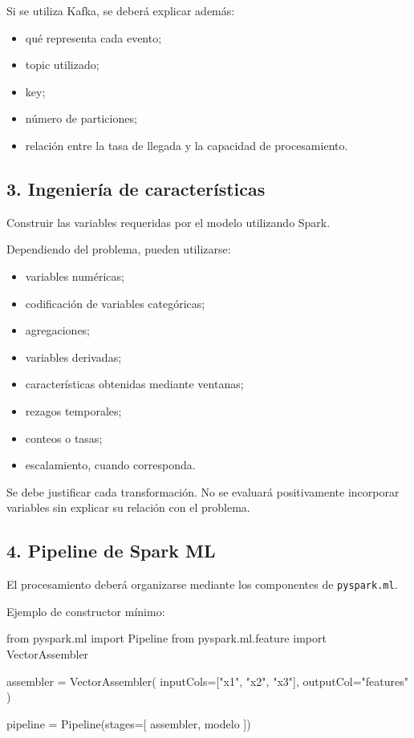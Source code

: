 \documentclass[11pt,a4paper]{article}
\begin{document}
Si se utiliza Kafka, se deberá explicar además:

\begin{itemize}
  \item qué representa cada evento;
  \item topic utilizado;
  \item key;
  \item número de particiones;
  \item relación entre la tasa de llegada y la capacidad de procesamiento.
\end{itemize}

\subsection{3. Ingeniería de características}

Construir las variables requeridas por el modelo utilizando Spark.

Dependiendo del problema, pueden utilizarse:

\begin{itemize}
  \item variables numéricas;
  \item codificación de variables categóricas;
  \item agregaciones;
  \item variables derivadas;
  \item características obtenidas mediante ventanas;
  \item rezagos temporales;
  \item conteos o tasas;
  \item escalamiento, cuando corresponda.
\end{itemize}

Se debe justificar cada transformación. No se evaluará positivamente incorporar variables sin
explicar su relación con el problema.

\subsection{4. Pipeline de Spark ML}

El procesamiento deberá organizarse mediante los componentes de \texttt{pyspark.ml}.

Ejemplo de constructor mínimo:

\begin{codebox}
from pyspark.ml import Pipeline
from pyspark.ml.feature import VectorAssembler

assembler = VectorAssembler(
    inputCols=["x1", "x2", "x3"],
    outputCol="features"
)

pipeline = Pipeline(stages=[
    assembler,
    modelo
])
\end{codebox}
\end{document}
